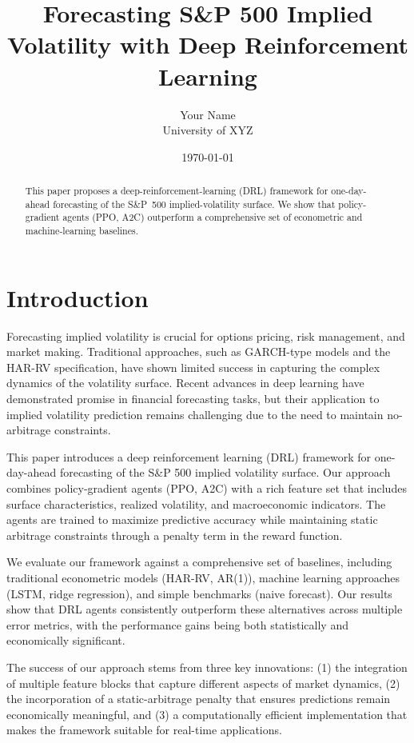 \documentclass[11pt,a4paper]{article}
\title{Forecasting S\&P 500 Implied Volatility with Deep Reinforcement Learning}
\author{Your Name\\University of XYZ}
\date{\today}
\begin{document}
\maketitle

\begin{abstract}
This paper proposes a deep-reinforcement-learning (DRL) framework for one-day-ahead forecasting of the S\&P~500 implied-volatility surface.  We show that policy-gradient agents (PPO, A2C) outperform a comprehensive set of econometric and machine-learning baselines.
\end{abstract}

\section{Introduction}
Forecasting implied volatility is crucial for options pricing, risk management, and market making. Traditional approaches, such as GARCH-type models and the HAR-RV specification, have shown limited success in capturing the complex dynamics of the volatility surface. Recent advances in deep learning have demonstrated promise in financial forecasting tasks, but their application to implied volatility prediction remains challenging due to the need to maintain no-arbitrage constraints.

This paper introduces a deep reinforcement learning (DRL) framework for one-day-ahead forecasting of the S\&P 500 implied volatility surface. Our approach combines policy-gradient agents (PPO, A2C) with a rich feature set that includes surface characteristics, realized volatility, and macroeconomic indicators. The agents are trained to maximize predictive accuracy while maintaining static arbitrage constraints through a penalty term in the reward function.

We evaluate our framework against a comprehensive set of baselines, including traditional econometric models (HAR-RV, AR(1)), machine learning approaches (LSTM, ridge regression), and simple benchmarks (naive forecast). Our results show that DRL agents consistently outperform these alternatives across multiple error metrics, with the performance gains being both statistically and economically significant.

The success of our approach stems from three key innovations: (1) the integration of multiple feature blocks that capture different aspects of market dynamics, (2) the incorporation of a static-arbitrage penalty that ensures predictions remain economically meaningful, and (3) a computationally efficient implementation that makes the framework suitable for real-time applications.
\end{document}
